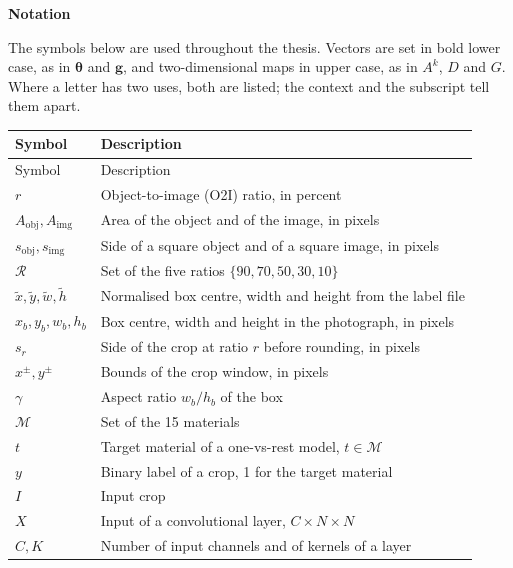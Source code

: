 \cleardoublepage
{}
{}
\thispagestyle{plain}
\vspace*{1.5cm}
{\noindent\Huge\bfseries Notation\par}
\vspace{.75cm}
The symbols below are used throughout the thesis. Vectors are set in bold lower case,
as in $\bm{\theta}$ and $\bm{g}$, and two-dimensional maps in upper case, as in $A^k$,
$D$ and $G$. Where a letter has two uses, both are listed; the context and the
subscript tell them apart.
\vspace{0.4cm}

\begingroup
\small
\setlength{\tabcolsep}{5pt}
\renewcommand{\arraystretch}{1.1}
\begin{longtable}{@{}p{}p{}@{}}
\toprule
Symbol & Description \\
\midrule
\endfirsthead
\toprule
Symbol & Description \\
\midrule
\endhead
$r$ & Object-to-image (O2I) ratio, in percent \\
$A_{\mathrm{obj}}, A_{\mathrm{img}}$ & Area of the object and of the image, in pixels \\
$s_{\mathrm{obj}}, s_{\mathrm{img}}$ & Side of a square object and of a square image, in pixels \\
$\mathcal{R}$ & Set of the five ratios $\{90, 70, 50, 30, 10\}$ \\
$\tilde{x}, \tilde{y}, \tilde{w}, \tilde{h}$ & Normalised box centre, width and height from the label file \\
$x_b, y_b, w_b, h_b$ & Box centre, width and height in the photograph, in pixels \\
$s_r$ & Side of the crop at ratio $r$ before rounding, in pixels \\
$x^{\pm}, y^{\pm}$ & Bounds of the crop window, in pixels \\
$\gamma$ & Aspect ratio $w_b/h_b$ of the box \\
$\mathcal{M}$ & Set of the 15 materials \\
$t$ & Target material of a one-vs-rest model, $t \in \mathcal{M}$ \\
$y$ & Binary label of a crop, 1 for the target material \\
$I$ & Input crop \\
$X$ & Input of a convolutional layer, $C \times N \times N$ \\
$C, K$ & Number of input channels and of kernels of a layer \\

\end{longtable}
